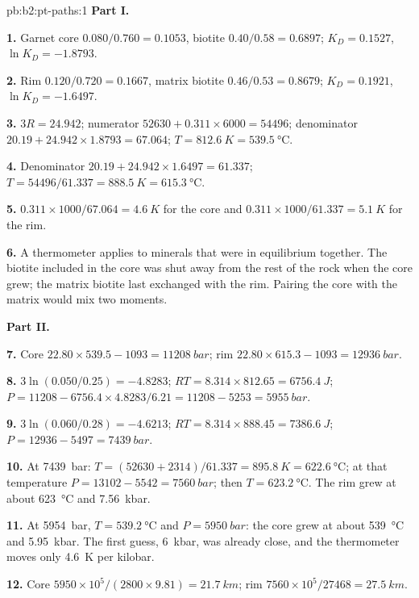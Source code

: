 \begin{solution}{pb:b2:pt-paths:1}
\noindent\textbf{Part I.}

\textbf{1.} Garnet core $0.080/0.760 = 0.1053$, biotite $0.40/0.58 = 0.6897$; $K_D =
0.1527$, $\ln K_D = -1.8793$.

\textbf{2.} Rim $0.120/0.720 = 0.1667$, matrix biotite $0.46/0.53 = 0.8679$; $K_D =
0.1921$, $\ln K_D = -1.6497$.

\textbf{3.} $3R = 24.942$; numerator $52630 + 0.311\times6000 = 54496$; denominator $20.19
+ 24.942\times1.8793 = 67.064$; $T = \qty{812.6}{K} = \qty{539.5}{\celsius}$.

\textbf{4.} Denominator $20.19 + 24.942\times1.6497 = 61.337$; $T = 54496/61.337 =
\qty{888.5}{K} = \qty{615.3}{\celsius}$.

\textbf{5.} $0.311\times1000/67.064 = \qty{4.6}{K}$ for the core and $0.311\times1000/61.337
= \qty{5.1}{K}$ for the rim.

\textbf{6.} A thermometer applies to minerals that were in equilibrium together. The
biotite included in the core was shut away from the rest of the rock when the core grew;
the matrix biotite last exchanged with the rim. Pairing the core with the matrix would mix
two moments.

\noindent\textbf{Part II.}

\textbf{7.} Core $22.80\times539.5 - 1093 = \qty{11208}{bar}$; rim $22.80\times615.3 -
1093 = \qty{12936}{bar}$.

\textbf{8.} $3\ln(0.050/0.25) = -4.8283$; $RT = 8.314\times812.65 = \qty{6756.4}{J}$; $P =
11208 - 6756.4\times4.8283/6.21 = 11208 - 5253 = \qty{5955}{bar}$.

\textbf{9.} $3\ln(0.060/0.28) = -4.6213$; $RT = 8.314\times888.45 = \qty{7386.6}{J}$; $P
= 12936 - 5497 = \qty{7439}{bar}$.

\textbf{10.} At \qty{7439}{bar}: $T = (52630 + 2314)/61.337 = \qty{895.8}{K} =
\qty{622.6}{\celsius}$; at that temperature $P = 13102 - 5542 = \qty{7560}{bar}$; then $T
= \qty{623.2}{\celsius}$. The rim grew at about \qty{623}{\celsius} and \qty{7.56}{kbar}.

\textbf{11.} At \qty{5954}{bar}, $T = \qty{539.2}{\celsius}$ and $P = \qty{5950}{bar}$: the
core grew at about \qty{539}{\celsius} and \qty{5.95}{kbar}. The first guess,
\qty{6}{kbar}, was already close, and the thermometer moves only \qty{4.6}{K} per kilobar.

\textbf{12.} Core $5950\times10^5/(2800\times9.81) = \qty{21.7}{km}$; rim
$7560\times10^5/27468 = \qty{27.5}{km}$.


\end{solution}
